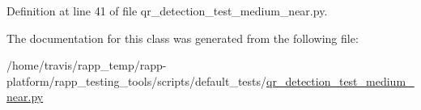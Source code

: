 Definition at line 41 of file qr\-\_\-detection\-\_\-test\-\_\-medium\-\_\-near.\-py.



The documentation for this class was generated from the following file\-:\begin{DoxyCompactItemize}
\item 
/home/travis/rapp\-\_\-temp/rapp-\/platform/rapp\-\_\-testing\-\_\-tools/scripts/default\-\_\-tests/\hyperlink{qr__detection__test__medium__near_8py}{qr\-\_\-detection\-\_\-test\-\_\-medium\-\_\-near.\-py}\end{DoxyCompactItemize}
